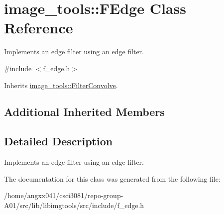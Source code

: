 \hypertarget{classimage__tools_1_1FEdge}{}\section{image\+\_\+tools\+:\+:F\+Edge Class Reference}
\label{classimage__tools_1_1FEdge}


Implements an edge filter using an edge filter.  




{\ttfamily \#include $<$f\+\_\+edge.\+h$>$}



Inherits \hyperlink{classimage__tools_1_1FilterConvolve}{image\+\_\+tools\+::\+Filter\+Convolve}.

\subsection*{Additional Inherited Members}


\subsection{Detailed Description}
Implements an edge filter using an edge filter. 

The documentation for this class was generated from the following file\+:\begin{DoxyCompactItemize}
\item 
/home/angxx041/csci3081/repo-\/group-\/\+A01/src/lib/libimgtools/src/include/f\+\_\+edge.\+h\end{DoxyCompactItemize}
